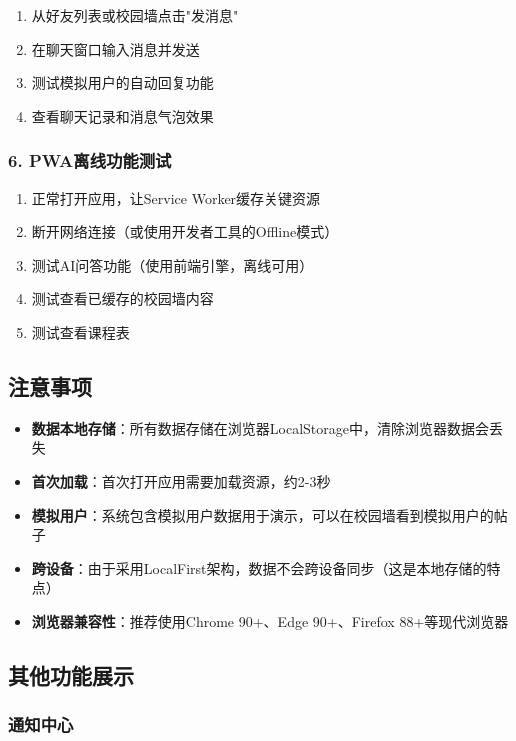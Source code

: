 \documentclass[12pt,a4paper]{article}
\begin{document}
\begin{enumerate}
    \item 从好友列表或校园墙点击"发消息"
    \item 在聊天窗口输入消息并发送
    \item 测试模拟用户的自动回复功能
    \item 查看聊天记录和消息气泡效果
\end{enumerate}

\subsubsection{6. PWA离线功能测试}

\begin{enumerate}
    \item 正常打开应用，让Service Worker缓存关键资源
    \item 断开网络连接（或使用开发者工具的Offline模式）
    \item 测试AI问答功能（使用前端引擎，离线可用）
    \item 测试查看已缓存的校园墙内容
    \item 测试查看课程表
\end{enumerate}

\subsection{注意事项}

\begin{itemize}
    \item \textbf{数据本地存储}：所有数据存储在浏览器LocalStorage中，清除浏览器数据会丢失
    \item \textbf{首次加载}：首次打开应用需要加载资源，约2-3秒
    \item \textbf{模拟用户}：系统包含模拟用户数据用于演示，可以在校园墙看到模拟用户的帖子
    \item \textbf{跨设备}：由于采用LocalFirst架构，数据不会跨设备同步（这是本地存储的特点）
    \item \textbf{浏览器兼容性}：推荐使用Chrome 90+、Edge 90+、Firefox 88+等现代浏览器
\end{itemize}

\subsection{其他功能展示}

\subsubsection{通知中心}
\end{document}
